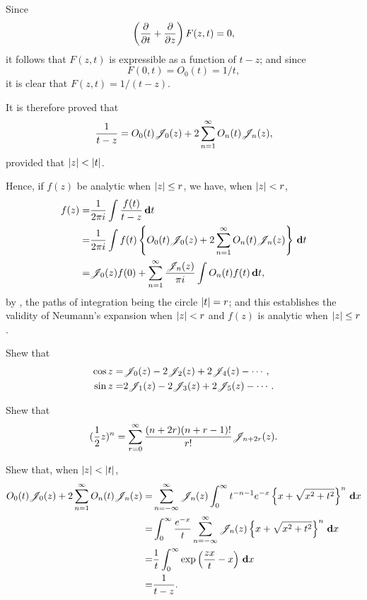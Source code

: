 Since
$$
\left(  \frac{\partial}{\partial t} + \frac{\partial}{\partial z}
 \right)
F(z,t)
=
0,
$$
it follows that $F(z,t)$ is expressible as a function of $t-z$; and
since
$$
F(0,t) = O_{0}(t) = 1/t,
$$
it is clear that $F(z,t) = 1/(t-z)$.

It is therefore proved that
$$
\frac{1}{t-z}
=
O_{0}(t) \mathscr{J}_{0}(z)
+ 2 \sum_{n=1}^{\infty}
O_{n}(t) \mathscr{J}_{n}(z),
$$
provided that $\left| z \right| < \left| t \right|$.

Hence, if $f(z)$ be analytic when $\left| z \right| \leq r$, we have, when
$\left| z \right| < r$,
\begin{align*}
  f(z)
  =&
  \frac{1}{2\pi i} \int \frac{f(t)}{t-z} \, \mathbf{d} t
  \\
  =&
  \frac{1}{2\pi i}
  \int f(t)
  \left\{ 
    O_{0}(t) \mathscr{J}_{0}(z) + 2 \sum_{n=1}^{\infty} O_{n}(t) \mathscr{J}_{n}(z)
   \right\}
  \, \mathbf{d} t
  \\
  =&
  \mathscr{J}_{0}(z) f(0)
  +
  \sum_{n=1}^{\infty} \frac{\mathscr{J}_{n}(z)}{\pi i}
  \int O_{n}(t)f(t) \, \mathbf{d} t,
\end{align*}
by , the paths of integration being the circle
$\left| t \right|=r$; and this establishes the validity of Neumann's
expansion when $\left| z \right| < r$ and $f(z)$ is analytic when
$\left| z \right|\leq r$.

%
%
\begin{wandwexample}
  Shew that
  \begin{align*}
    \cos z =& \mathscr{J}_{0}(z) - 2\mathscr{J}_{2}(z) + 2\mathscr{J}_{4}(z) - \cdots, \\
    \sin z =& 2\mathscr{J}_{1}(z) - 2\mathscr{J}_{3}(z) + 2\mathscr{J}_{5}(z) - \cdots.
  \end{align*}
\end{wandwexample}
\begin{wandwexample}
  Shew that
  $$
  (\frac{1}{2} z)^{n}
  =
  \sum_{r=0}^{\infty}
  \frac{(n+2r)(n+r-1)!}{r!}
  \mathscr{J}_{n+2r}(z).
  $$
\end{wandwexample}
\begin{wandwexample}
  Shew that, when $\left| z \right|<\left| t \right|$,
  \begin{align*}
    O_{0}(t) \mathscr{J}_{0}(z)
    +
    2 \sum_{n=1}^{\infty} O_{n}(t) \mathscr{J}_{n}(z)
    =&
    \sum_{n=-\infty}^{\infty}
    \mathscr{J}_{n}(z)
    \int_{0}^{\infty}
    t^{-n-1}
    e^{-x}
    \left\{ 
      x + \sqrt{x^{2} + t^{2}}
     \right\}^{n}
    \, \mathbf{d} x
    \\
    =&
    \int_{0}^{\infty}
    \frac{e^{-x}}{t}
    \sum_{n=-\infty}^{\infty}
    \mathscr{J}_{n}(z)
    \left\{ 
      x + \sqrt{x^{2} + t^{2}}
     \right\}^{n}
    \, \mathbf{d} x
    \\
    =&
    \frac{1}{t}
    \int_{0}^{\infty} \exp \left(  \frac{zx}{t} - x  \right) \, \mathbf{d} x
    \\
    =&
    \frac{1}{t-z}.
  \end{align*}
\end{wandwexample}

